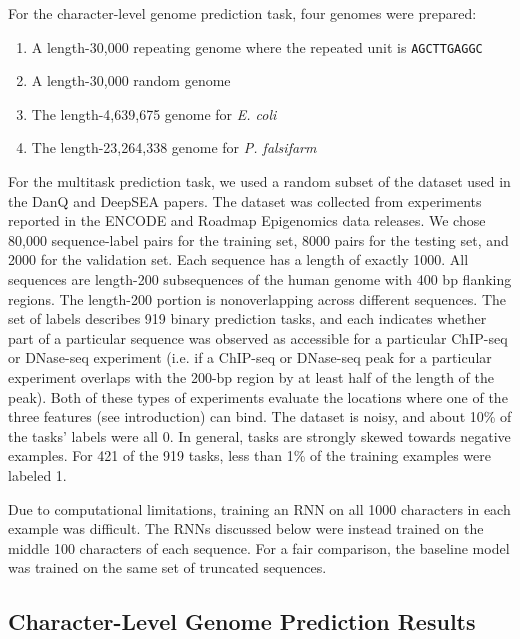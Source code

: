 \documentclass{article} %
\begin{document}
For the character-level genome prediction task, four genomes were prepared:
\begin{enumerate}
	\item A length-30,000 repeating genome where the repeated unit is \texttt{AGCTTGAGGC}
	\item A length-30,000 random genome
	\item The length-4,639,675 genome for \textit{E. coli}
	\item The length-23,264,338 genome for \textit{P. falsifarm}
\end{enumerate}


For the multitask prediction task, we used a random subset of the dataset used in the DanQ \cite{quang2015danq} and DeepSEA \cite{zhou2015predicting} papers. The dataset was collected from experiments reported in the ENCODE \cite{encode2012integrated} and Roadmap Epigenomics \cite{kundaje2015integrative} data releases. We chose 80,000 sequence-label pairs for the training set, 8000 pairs for the testing set, and 2000 for the validation set. Each sequence has a length of exactly 1000. All sequences are length-200 subsequences of the human genome with 400 bp flanking regions. The length-200 portion is nonoverlapping across different sequences. The set of labels describes 919 binary prediction tasks, and each indicates whether part of a particular sequence was observed as accessible for a particular ChIP-seq or DNase-seq experiment (i.e. if a ChIP-seq or DNase-seq peak for a particular experiment overlaps with the 200-bp region by at least half of the length of the peak). Both of these types of experiments evaluate the locations where one of the three features (see introduction) can bind. The dataset is noisy, and about 10\% of the tasks' labels were all 0. In general, tasks are strongly skewed towards negative examples. For 421 of the 919 tasks, less than 1\% of the training examples were labeled 1.

Due to computational limitations, training an RNN on all 1000 characters in each example was difficult. The RNNs discussed below were instead trained on the middle 100 characters of each sequence. For a fair comparison, the baseline model was trained on the same set of truncated sequences. 

\subsection{Character-Level Genome Prediction Results}
\end{document}

